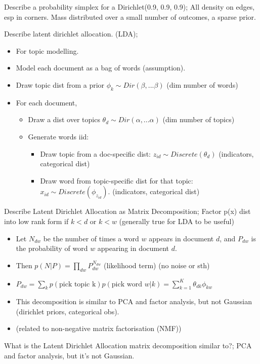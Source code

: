 \documentclass{article}
\begin{document}
Describe a probability simplex for a Dirichlet(0.9, 0.9, 0.9); All density on edges, esp in corners. Mass distributed over a small number of outcomes, a sparse prior.

Describe latent dirichlet allocation. (LDA); \begin{itemize} \item For topic modelling.  \item Model each document as a bag of words (assumption). \item Draw topic dist from a prior $\phi_k\sim Dir(\beta, ...\beta)$ (dim number of words) \item For each document, \begin{itemize} \item Draw a dist over topics $\theta_d \sim Dir(\alpha, ...\alpha)$ (dim number of topics) \item Generate words iid: \begin{itemize} \item Draw topic from a doc-specific dist: $z_{id}\sim Discrete (\theta_d)$ (indicators, categorical dist) \item Draw word from topic-specific dist for that topic: $x_{id}\sim Discrete(\phi_{z_{id}})$. (indicators, categorical dist) \end{itemize} \end{itemize} \end{itemize}

Describe Latent Dirichlet Allocation as Matrix Decomposition; Factor p(x) dist into low rank form  if $k<d$ or $k<w$  (generally true for LDA to be useful) \begin{itemize} \item Let $N_{dw}$ be the number of times a word $w$ appears in document $d$, and $P_{dw}$ is the probability of word $w$ appearing in document $d$. \item Then $p(N|P)=\prod_{dw}P^{N_{dw}}_{dw}$ (likelihood term) (no noise or sth) \item $P_{dw}=\sum_k p(\text{pick topic k})p(\text{pick word }w|k)=\sum_{k=1}^K\theta_{dk}\phi_{kw}$ \item This decomposition is similar to PCA and factor analysis, but not Gaussian (dirichlet priors, categorical obs). \item (related to non-negative matrix factorisation (NMF)) \end{itemize}

What is the Latent Dirichlet Allocation matrix decomposition similar to?; PCA and factor analysis, but it's not Gaussian.
\end{document}
